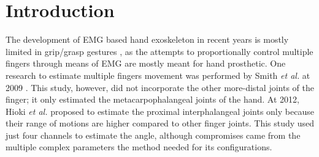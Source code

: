\documentclass[conference]{IEEEtran}
\begin{document}
\section{Introduction}



The development of EMG based hand exoskeleton in recent years is mostly limited in grip/grasp gestures \cite{b11}\cite{b12}\cite{b13}, as the attempts to proportionally control multiple fingers through means of EMG are 
mostly meant for hand prosthetic. One research to estimate multiple fingers movement was performed by 
Smith \textit{et al.} at 2009 \cite{b14}. This study, however, did not incorporate the other more-distal joints of the finger;
it only estimated the metacarpophalangeal joints of the hand. At 2012, Hioki \textit{et al.} \cite{b15} proposed to estimate 
the proximal interphalangeal joints only because their range of motions are higher compared to other finger 
joints. This study used just four channels to estimate the angle, although compromises came from the 
multiple complex parameters the method needed for its configurations.
\end{document}
